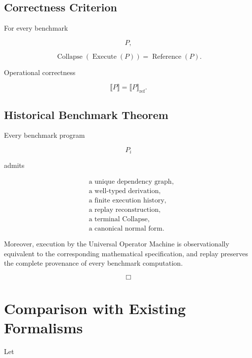 \documentclass[12pt,oneside]{article}
\theoremstyle{definition}
\theoremstyle{remark}
\begin{document}
\subsection*{Correctness Criterion}

For every benchmark

\[
P,
\]

\[
\operatorname{Collapse}
(
\operatorname{Execute}(P)
)
=
\operatorname{Reference}(P).
\]

Operational correctness

\[
\llbracket
P
\rrbracket
=
\llbracket
P
\rrbracket_{\mathrm{ref}}.
\]

\subsection*{Historical Benchmark Theorem}

Every benchmark program

\[
P_i
\]

admits

\[
\boxed{
\begin{aligned}
&
\text{a unique dependency graph},\\
&
\text{a well-typed derivation},\\
&
\text{a finite execution history},\\
&
\text{a replay reconstruction},\\
&
\text{a terminal Collapse},\\
&
\text{a canonical normal form}.
\end{aligned}
}
\]

Moreover, execution by the Universal Operator Machine is observationally equivalent to the corresponding mathematical specification, and replay preserves the complete provenance of every benchmark computation.

\[
\Box
\]

\section{Comparison with Existing Formalisms}

Let
\end{document}
